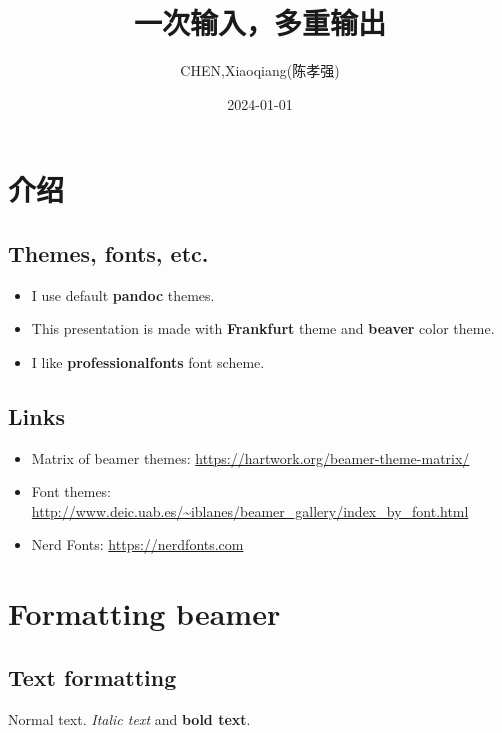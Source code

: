 \documentclass[
  11pt,
]{article}
\title{一次输入，多重输出}
\author{CHEN,Xiaoqiang(陈孝强)}
\date{2024-01-01}
\providecommand{\tightlist}{%
  \setlength{\itemsep}{0pt}\setlength{\parskip}{0pt}}
\begin{document}
\maketitle

{
\hypersetup{linkcolor=}
\setcounter{tocdepth}{3}
\tableofcontents
}
\section{介绍}\label{ux4ecbux7ecd}

\subsection{Themes, fonts, etc.}\label{themes-fonts-etc.}

\begin{itemize}
\tightlist
\item
  I use default \textbf{pandoc} themes.
\item
  This presentation is made with \textbf{Frankfurt} theme and
  \textbf{beaver} color theme.
\item
  I like \textbf{professionalfonts} font scheme.
\end{itemize}

\subsection{Links}\label{links}

\begin{itemize}
\tightlist
\item
  Matrix of beamer themes:
  \url{https://hartwork.org/beamer-theme-matrix/}
\item
  Font themes:
  \url{http://www.deic.uab.es/~iblanes/beamer_gallery/index_by_font.html}
\item
  Nerd Fonts: \url{https://nerdfonts.com}
\end{itemize}

\section{Formatting beamer}\label{formatting-beamer}

\subsection{Text formatting}\label{text-formatting}

Normal text. \emph{Italic text} and \textbf{bold text}.
\end{document}
